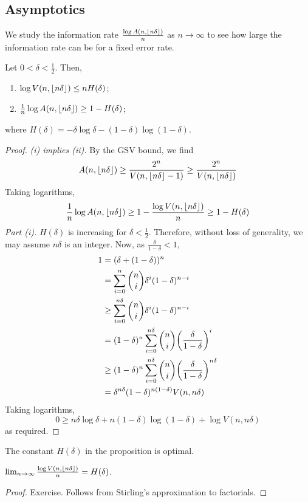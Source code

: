 \subsection{Asymptotics}
We study the information rate \( \frac{\log A(n,\floor*{n\delta})}{n} \) as \( n \to \infty \) to see how large the information rate can be for a fixed error rate.
\begin{proposition}
    Let \( 0 < \delta < \frac{1}{2} \).
    Then,
    \begin{enumerate}
        \item \( \log V(n,\floor*{n\delta}) \leq nH(\delta) \);
        \item \( \frac{1}{n} \log A(n,\floor*{n\delta}) \geq 1 - H(\delta) \);
    \end{enumerate}
    where \( H(\delta) = -\delta \log \delta - (1-\delta)\log (1-\delta) \).
\end{proposition}
\begin{proof}
    \emph{(i) implies (ii).}
    By the GSV bound, we find
    \[ A(n,\floor*{n\delta}) \geq \frac{2^n}{V(n,\floor*{n\delta} - 1)} \geq \frac{2^n}{V(n,\floor*{n\delta})} \]
    Taking logarithms,
    \[ \frac{1}{n}\log A(n,\floor*{n\delta}) \geq 1 - \frac{\log V(n,\floor*{n\delta})}{n} \geq 1 - H(\delta) \]
    \emph{Part (i).}
    \( H(\delta) \) is increasing for \( \delta < \frac{1}{2} \).
    Therefore, without loss of generality, we may assume \( n\delta \) is an integer.
    Now, as \( \frac{\delta}{1-\delta} < 1 \),
    \begin{align*}
        1 &= (\delta + (1-\delta))^n \\
        &= \sum_{i=0}^n \binom{n}{i} \delta^i (1-\delta)^{n-i} \\
        &\geq \sum_{i=0}^{n\delta} \binom{n}{i} \delta^i (1-\delta)^{n-i} \\
        &= (1-\delta)^n \sum_{i=0}^{n\delta} \binom{n}{i} \qty(\frac{\delta}{1-\delta})^i \\
        &\geq (1-\delta)^n \sum_{i=0}^{n\delta} \binom{n}{i} \qty(\frac{\delta}{1-\delta})^{n\delta} \\
        &= \delta^{n\delta} (1-\delta)^{n(1-\delta)} V(n,n\delta)
    \end{align*}
    Taking logarithms,
    \[ 0 \geq n\delta \log \delta + n(1-\delta) \log(1-\delta) + \log V(n,n\delta) \]
    as required.
\end{proof}
The constant \( H(\delta) \) in the proposition is optimal.
\begin{lemma}
    \( \lim_{n \to \infty} \frac{\log V(n,\floor*{n\delta})}{n} = H(\delta) \).
\end{lemma}
\begin{proof}
    Exercise.
    Follows from Stirling's approximation to factorials.
\end{proof}

